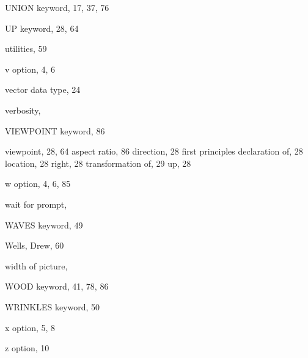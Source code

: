 \begin{theindex}
  \indexspace

  \item {\ptt UNION} keyword, 17, 37, 76
  \item {\ptt UP} keyword, 28, 64
  \item utilities, 59

  \indexspace

  \item {\ptt v} option, 4, 6
  \item vector data type, 24
  \item verbosity, 
  \item {\ptt VIEWPOINT} keyword, 86
  \item viewpoint, 28, 64
    \subitem aspect ratio, 86
    \subitem direction, 28
    \subitem first principles declaration of, 28
    \subitem location, 28
    \subitem right, 28
    \subitem transformation of, 29
    \subitem up, 28

  \indexspace

  \item {\ptt w} option, 4, 6, 85
  \item wait for prompt, 
  \item {\ptt WAVES} keyword, 49
  \item Wells, Drew, 60
  \item width of picture, 
  \item {\ptt WOOD} keyword, 41, 78, 86
  \item {\ptt WRINKLES} keyword, 50

  \indexspace

  \item {\ptt x} option, 5, 8

  \indexspace

  \item {\ptt z} option, 10

\end{theindex}
